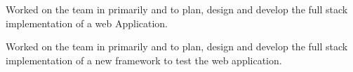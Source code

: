 \documentclass[]{openfont}
\begin{document}
\begin{minipage}[t]{0.66\textwidth}
\begin{tightemize}
\item Worked on the  team in primarily  and  to plan, design and develop the full stack implementation of a web Application.
\item Worked on the   team in primarily  and  to plan, design and develop the full stack implementation of a new framework to test the web application.
\end{tightemize}
\sectionsep







\end{minipage}
\end{document}
